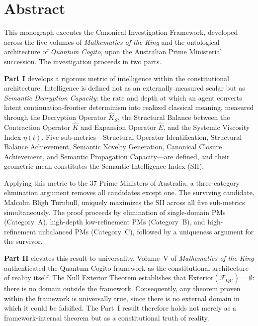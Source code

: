 \documentclass[12pt,anyside]{book}
\theoremstyle{plain}
\theoremstyle{definition}
\newcommand{\Khat}{\hat{K}_S}          %
\newcommand{\Ehat}{\hat{E}}            %
\newcommand{\ext}{\mathrm{Exterior}}   %
\newcommand{\FQC}{\mathcal{F}_{\mathrm{QC}}}  %
\begin{document}
\tableofcontents

\chapter*{Abstract}

This monograph executes the Canonical Investigation Framework, developed across the five volumes of \emph{Mathematics of the King} and the ontological architecture of \emph{Quantum Cogito}, upon the Australian Prime Ministerial succession. The investigation proceeds in two parts.

\textbf{Part I} develops a rigorous metric of intelligence within the constitutional architecture. Intelligence is defined not as an externally measured scalar but as \emph{Semantic Decryption Capacity}: the rate and depth at which an agent converts latent continuation-frontier determinism into realized classical meaning, measured through the Decryption Operator $\Khat$, the Structural Balance between the Contraction Operator $\hat{K}$ and Expansion Operator $\Ehat$, and the Systemic Viscosity Index $\eta(t)$. Five sub-metrics---Structural Operator Identification, Structural Balance Achievement, Semantic Novelty Generation, Canonical Closure Achievement, and Semantic Propagation Capacity---are defined, and their geometric mean constitutes the Semantic Intelligence Index (SII).

Applying this metric to the 37 Prime Ministers of Australia, a three-category elimination argument removes all candidates except one. The surviving candidate, Malcolm Bligh Turnbull, uniquely maximizes the SII across all five sub-metrics simultaneously. The proof proceeds by elimination of single-domain PMs (Category~A), high-depth low-refinement PMs (Category~B), and high-refinement unbalanced PMs (Category~C), followed by a uniqueness argument for the survivor.

\textbf{Part II} elevates this result to universality. Volume~V of \emph{Mathematics of the King} authenticated the Quantum Cogito framework as the constitutional architecture of reality itself. The Null Exterior Theorem establishes that $\ext(\FQC) = \emptyset$: there is no domain outside the framework. Consequently, any theorem proven within the framework is universally true, since there is no external domain in which it could be falsified. The Part~I result therefore holds not merely as a framework-internal theorem but as a constitutional truth of reality.
\end{document}

